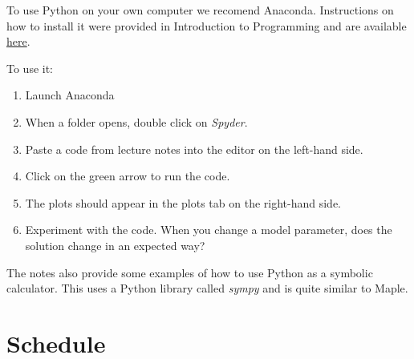 \documentclass[
  letterpaper,
  DIV=11,
  numbers=noendperiod]{scrreprt}
\providecommand{\tightlist}{%
  \setlength{\itemsep}{0pt}\setlength{\parskip}{0pt}}
\begin{document}
\begin{tcolorbox}[enhanced jigsaw, arc=.35mm, bottomrule=.15mm, bottomtitle=1mm, breakable, colback=white, colbacktitle=quarto-callout-note-color!10!white, colframe=quarto-callout-note-color-frame, coltitle=black, left=2mm, leftrule=.75mm, opacityback=0, opacitybacktitle=0.6, rightrule=.15mm, title=\textcolor{quarto-callout-note-color}{\faInfo}\hspace{0.5em}{Note}, titlerule=0mm, toprule=.15mm, toptitle=1mm]

To use Python on your own computer we recomend Anaconda. Instructions on
how to install it were provided in Introduction to Programming and are
available
\href{https://www.twinyard.co.uk/DI32011/assets/pythonIntro.pdf}{here}.

To use it:

\begin{enumerate}
\def\labelenumi{\arabic{enumi}.}
\tightlist
\item
  Launch Anaconda
\item
  When a folder opens, double click on \emph{Spyder}.
\item
  Paste a code from lecture notes into the editor on the left-hand side.
\item
  Click on the green arrow to run the code.
\item
  The plots should appear in the plots tab on the right-hand side.
\item
  Experiment with the code. When you change a model parameter, does the
  solution change in an expected way?
\end{enumerate}

\end{tcolorbox}

The notes also provide some examples of how to use Python as a symbolic
calculator. This uses a Python library called \emph{sympy} and is quite
similar to Maple.

\section*{Schedule}\label{schedule}

\end{document}
